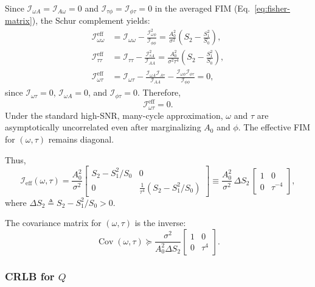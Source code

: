 \documentclass[11pt]{article}
\begin{document}
Since $\mathcal{I}_{\omega A} = \mathcal{I}_{A\omega} = 0$ and $\mathcal{I}_{\tau\phi} = \mathcal{I}_{\phi\tau} = 0$ in the averaged FIM (Eq.~\eqref{eq:fisher-matrix}), the Schur complement yields:
\begin{align}
\mathcal{I}_{\omega\omega}^{\text{eff}} &= \mathcal{I}_{\omega\omega} - \frac{\mathcal{I}_{\omega\phi}^2}{\mathcal{I}_{\phi\phi}}
= \frac{A_0^2}{\sigma^2} \left( S_2 - \frac{S_1^2}{S_0} \right), \\
\mathcal{I}_{\tau\tau}^{\text{eff}} &= \mathcal{I}_{\tau\tau} - \frac{\mathcal{I}_{\tau A}^2}{\mathcal{I}_{AA}}
= \frac{A_0^2}{\sigma^2 \tau^4} \left( S_2 - \frac{S_1^2}{S_0} \right), \\
\mathcal{I}_{\omega\tau}^{\text{eff}} &= \mathcal{I}_{\omega\tau} - \frac{\mathcal{I}_{\omega A} \mathcal{I}_{A\tau}}{\mathcal{I}_{AA}} - \frac{\mathcal{I}_{\omega\phi} \mathcal{I}_{\phi\tau}}{\mathcal{I}_{\phi\phi}} = 0,
\end{align}
since $\mathcal{I}_{\omega\tau} = 0$, $\mathcal{I}_{\omega A} = 0$, and $\mathcal{I}_{\phi\tau} = 0$. Therefore,
\[
\boxed{
\mathcal{I}_{\omega\tau}^{\text{eff}} = 0.
}
\]
Under the standard high-SNR, many-cycle approximation, $\omega$ and $\tau$ are asymptotically uncorrelated even after marginalizing $A_0$ and $\phi$. The effective FIM for $(\omega, \tau)$ remains diagonal.

Thus,
\begin{equation}
\mathcal{I}_{\text{eff}}(\omega,\tau) =
\frac{A_0^2}{\sigma^2}
\begin{bmatrix}
S_2 - S_1^2/S_0 & 0 \\
0 & \frac{1}{\tau^4}\left(S_2 - S_1^2/S_0\right)
\end{bmatrix}
\equiv
\frac{A_0^2}{\sigma^2} \, \Delta S_2 \,
\begin{bmatrix}
1 & 0 \\
0 & \tau^{-4}
\end{bmatrix},
\label{eq:I_eff_wt}
\end{equation}
where $\Delta S_2 \triangleq S_2 - S_1^2/S_0 > 0$.

The covariance matrix for $(\omega, \tau)$ is the inverse:
\[
\operatorname{Cov}(\omega, \tau) \succeq
\frac{\sigma^2}{A_0^2 \Delta S_2}
\begin{bmatrix}
1 & 0 \\
0 & \tau^4
\end{bmatrix}.
\]

\subsubsection{CRLB for $Q$}
\end{document}
